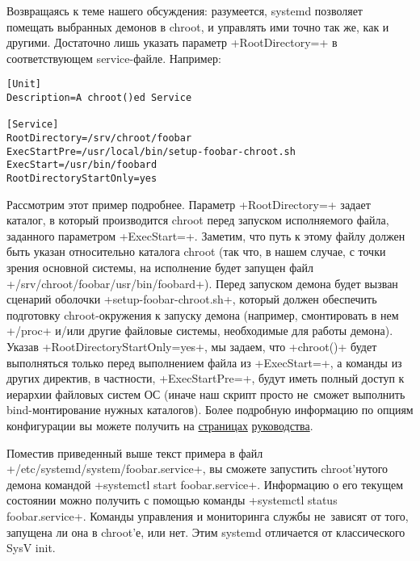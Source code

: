 \documentclass[10pt,oneside,a4paper]{article}
\begin{document}
Возвращаясь к теме нашего обсуждения: разумеется, systemd позволяет помещать
выбранных демонов в chroot, и управлять ими точно так же, как и другими.
Достаточно лишь указать параметр +RootDirectory=+ в соответствующем
service-файле. Например:
\begin{Verbatim}
[Unit]
Description=A chroot()ed Service

[Service]
RootDirectory=/srv/chroot/foobar
ExecStartPre=/usr/local/bin/setup-foobar-chroot.sh
ExecStart=/usr/bin/foobard
RootDirectoryStartOnly=yes
\end{Verbatim}

Рассмотрим этот пример подробнее. Параметр +RootDirectory=+ задает каталог, в
который производится chroot перед запуском исполняемого файла, заданного
параметром +ExecStart=+. Заметим, что путь к этому файлу должен быть указан
относительно каталога chroot (так что, в нашем случае, с точки зрения основной
системы, на исполнение будет запущен файл +/srv/chroot/foobar/usr/bin/foobard+).
Перед запуском демона будет вызван сценарий оболочки +setup-foobar-chroot.sh+,
который должен обеспечить подготовку chroot-окружения к запуску демона
(например, смонтировать в нем +/proc+ и/или другие файловые системы, необходимые
для работы демона). Указав +RootDirectoryStartOnly=yes+, мы задаем, что
+chroot()+ будет выполняться только перед выполнением файла из +ExecStart=+, а
команды из других директив, в частности, +ExecStartPre=+, будут иметь полный
доступ к иерархии файловых систем ОС (иначе наш скрипт просто не~сможет
выполнить bind-монтирование нужных каталогов). Более подробную информацию по
опциям конфигурации вы можете получить на
\href{http://0pointer.de/public/systemd-man/systemd.service.html}{страницах}
\href{http://0pointer.de/public/systemd-man/systemd.exec.html}{руководства}.

Поместив приведенный выше текст примера в файл
+/etc/systemd/system/foobar.service+, вы сможете запустить chroot'нутого демона
командой +systemctl start foobar.service+. Информацию о его текущем состоянии
можно получить с помощью команды +systemctl status foobar.service+. Команды
управления и мониторинга службы не~зависят от того, запущена ли она в chroot'е,
или нет. Этим systemd отличается от классического SysV init.
\end{document}

